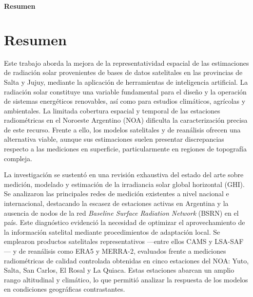 \rhead{}
\lhead{}
\renewcommand{\headrulewidth}{0pt}
\begin{center}
    \Large
    \textbf{\newtitle}
    
    \large
    \vspace{0.4cm}
    \newauthor
    \vspace{0.9cm}
    
    \textbf{Resumen}
\end{center}

\section*{Resumen}


Este trabajo aborda la mejora de la representatividad espacial de las estimaciones de
radiación solar provenientes de bases de datos satelitales en las provincias de Salta y
Jujuy, mediante la aplicación de herramientas de inteligencia artificial. La radiación solar
constituye una variable fundamental para el diseño y la operación de sistemas energéticos
renovables, así como para estudios climáticos, agrícolas y ambientales. La limitada cobertura
espacial y temporal de las estaciones radiométricas en el Noroeste Argentino (NOA) dificulta
la caracterización precisa de este recurso. Frente a ello, los modelos satelitales y de
reanálisis ofrecen una alternativa viable, aunque sus estimaciones suelen presentar
discrepancias respecto a las mediciones en superficie, particularmente en regiones de
topografía compleja.
 
La investigación se sustentó en una revisión exhaustiva del estado del arte sobre medición,
modelado y estimación de la irradiancia solar global horizontal (GHI). Se analizaron las
principales redes de medición existentes a nivel nacional e internacional, destacando la
escasez de estaciones activas en Argentina y la ausencia de nodos de la red
\textit{Baseline Surface Radiation Network} (BSRN) en el país. Este diagnóstico evidenció la
necesidad de optimizar el aprovechamiento de la información satelital mediante procedimientos
de adaptación local. Se emplearon productos satelitales representativos ---entre ellos CAMS y
LSA-SAF--- y de reanálisis como ERA5 y MERRA-2, evaluados frente a mediciones radiométricas
de calidad controlada obtenidas en cinco estaciones del NOA: Yuto, Salta, San Carlos, El
Rosal y La Quiaca. Estas estaciones abarcan un amplio rango altitudinal y climático, lo que
permitió analizar la respuesta de los modelos en condiciones geográficas contrastantes.
 
